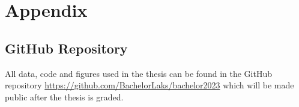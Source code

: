 \section*{Appendix}\label{sec:appendix}
\subsection*{GitHub Repository}\label{subsec:github}
All data, code and figures used in the thesis can be found in the GitHub repository \url{https://github.com/BachelorLaks/bachelor2023} which will be made public after the thesis is graded. 
